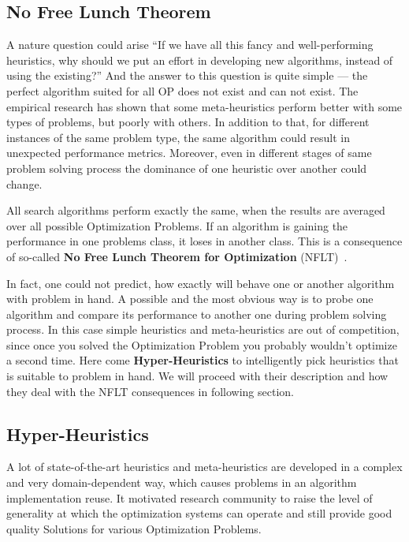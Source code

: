 

\subsection{No Free Lunch Theorem}
A nature question could arise ``If we have all this fancy and well-performing heuristics, why should we put an effort in developing new algorithms, instead of using the existing?'' And the answer to this question is quite simple — the perfect algorithm suited for all OP does not exist and can not exist. 
The empirical research has shown that some meta-heuristics perform better with some types of problems, but poorly with others. In addition to that, for different instances of the same problem type, the same algorithm could result in unexpected performance metrics. Moreover, even in different stages of same problem solving process the dominance of one heuristic over another could change. 

All search algorithms perform exactly the same, when the results are averaged over all possible Optimization Problems. If an algorithm is gaining the performance in one problems class, it loses in another class. This is a consequence of so-called \textbf{No Free Lunch Theorem for Optimization} (NFLT)~\cite{wolpert1997no}.

In fact, one could not predict, how exactly will behave one or another algorithm with problem in hand. A possible and the most obvious way is to probe one algorithm and compare its performance to another one during problem solving process. In this case simple heuristics and meta-heuristics are out of competition, since once you solved the Optimization Problem you probably wouldn't optimize a second time.
Here come \textbf{Hyper-Heuristics} to intelligently pick heuristics that is suitable to problem in hand. We will proceed with their description and how they deal with the NFLT consequences in following section.


\subsection{Hyper-Heuristics}\label{bg: hh}
A lot of state-of-the-art heuristics and meta-heuristics are developed in a complex and very domain-dependent way, which causes problems in an algorithm implementation reuse. It motivated research community to raise the level of generality at which the optimization systems can operate and still provide good quality Solutions for various Optimization Problems. 

